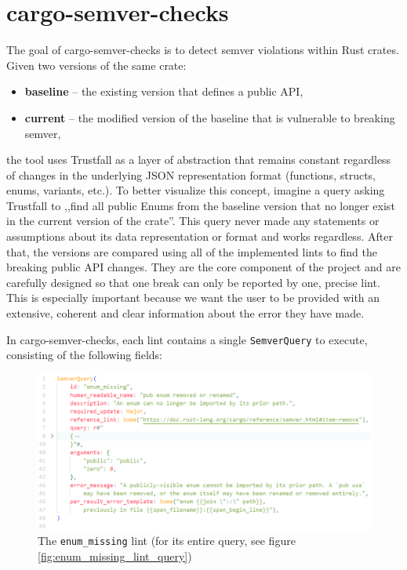 \documentclass[licencjacka,en]{pracamgr}
\begin{document}
\section{cargo-semver-checks}\label{r:section_cargo_semver_checks}

The goal of cargo-semver-checks is to detect semver violations within Rust crates. Given two versions
of the same crate:
\begin{itemize}
	\item \textbf{baseline} -- the existing version that defines a public API,
	\item \textbf{current} -- the modified version of the baseline that is vulnerable to breaking semver,
\end{itemize}
the tool uses Trustfall as a layer of abstraction that remains constant regardless of changes in the underlying JSON representation format
(functions, structs, enums, variants, etc.). To better visualize this concept, imagine a query
asking Trustfall to ,,find all public Enums from the baseline version that no longer exist in the
current version of the crate''. This query never made any statements or assumptions about its data
representation or format and works regardless. After that, the versions are compared using all of
the implemented lints to find the breaking public API changes. They are the core component of
the project and are carefully designed so that one break can only be reported by one, precise
lint. This is especially important because we want the user to be provided with an extensive, coherent
and clear information about the error they have made.


In cargo-semver-checks, each lint contains a single \texttt{SemverQuery} to execute, consisting of
the following fields:

\begin{figure}[h]
	\centering
	\includegraphics[width=\linewidth]{lint-example.png}
	\caption{The \texttt{enum\_missing} lint (for its entire query, see figure
		\ref{fig:enum_missing_lint_query})}
	\label{fig:enum_missing_lint}
\end{figure}
\end{document}
